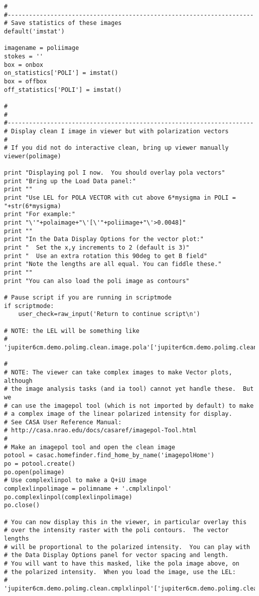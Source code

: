 \begin{verbatim}
#
#---------------------------------------------------------------------
# Save statistics of these images
default('imstat')

imagename = poliimage
stokes = ''
box = onbox
on_statistics['POLI'] = imstat()
box = offbox
off_statistics['POLI'] = imstat()

#
#
#---------------------------------------------------------------------
# Display clean I image in viewer but with polarization vectors
#
# If you did not do interactive clean, bring up viewer manually
viewer(polimage)

print "Displaying pol I now.  You should overlay pola vectors"
print "Bring up the Load Data panel:"
print ""
print "Use LEL for POLA VECTOR with cut above 6*mysigma in POLI = "+str(6*mysigma)
print "For example:"
print "\'"+polaimage+"\'[\'"+poliimage+"\'>0.0048]"
print ""
print "In the Data Display Options for the vector plot:"
print "  Set the x,y increments to 2 (default is 3)"
print "  Use an extra rotation this 90deg to get B field"
print "Note the lengths are all equal. You can fiddle these."
print ""
print "You can also load the poli image as contours"

# Pause script if you are running in scriptmode
if scriptmode:
    user_check=raw_input('Return to continue script\n')

# NOTE: the LEL will be something like
# 'jupiter6cm.demo.polimg.clean.image.pola'['jupiter6cm.demo.polimg.clean.image.poli'>0.005]

#
# NOTE: The viewer can take complex images to make Vector plots, although
# the image analysis tasks (and ia tool) cannot yet handle these.  But we
# can use the imagepol tool (which is not imported by default) to make
# a complex image of the linear polarized intensity for display.
# See CASA User Reference Manual:
# http://casa.nrao.edu/docs/casaref/imagepol-Tool.html
#
# Make an imagepol tool and open the clean image 
potool = casac.homefinder.find_home_by_name('imagepolHome')
po = potool.create()
po.open(polimage)
# Use complexlinpol to make a Q+iU image
complexlinpolimage = polimname + '.cmplxlinpol'
po.complexlinpol(complexlinpolimage)
po.close()

# You can now display this in the viewer, in particular overlay this
# over the intensity raster with the poli contours.  The vector lengths
# will be proportional to the polarized intensity.  You can play with
# the Data Display Options panel for vector spacing and length.
# You will want to have this masked, like the pola image above, on
# the polarized intensity.  When you load the image, use the LEL:
# 'jupiter6cm.demo.polimg.clean.cmplxlinpol'['jupiter6cm.demo.polimg.clean.image.poli'>0.005]


\end{verbatim}
